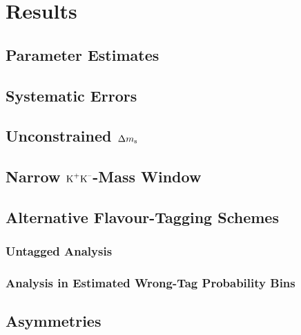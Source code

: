 \chapter{Results}
\label{chap:result}

\section{Parameter Estimates}
\label{sec:result_paramEst}
\section{Systematic Errors}
\section{Unconstrained \texorpdfstring{$\Delta m_\text{s}$}{Deltams}}
\section{Narrow \texorpdfstring{$\text{K}^\text{+}\text{K}^\text{--}$}{KK}-Mass Window}
\section{Alternative Flavour-Tagging Schemes}
\subsection{Untagged Analysis}
\subsection{Analysis in Estimated Wrong-Tag Probability Bins}
\section{\texorpdfstring{\BsBsbar{}}{Bs0-Bs0bar} Asymmetries}
